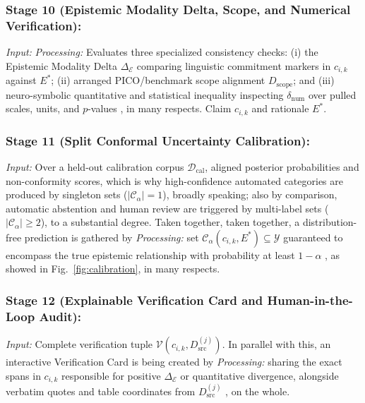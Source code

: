 \documentclass[sigconf]{acmart}
\begin{document}
\subsubsection{Stage 10 (Epistemic Modality Delta, Scope, and Numerical Verification):}
\emph{Input:} \emph{Processing:} Evaluates three specialized consistency checks: (i) the Epistemic Modality Delta $\Delta_{\mathcal{E}}$ comparing linguistic commitment markers \cite{hyland1998hedging} in $c_{i,k}$ against $E^*$; (ii) arranged PICO/benchmark scope alignment $D_{\text{scope}}$; and (iii) neuro-symbolic quantitative and statistical inequality inspecting $\delta_{\text{num}}$ over pulled scales, units, and $p$-values \cite{lu2023scitab,akhtar2023reading}, in many respects. Claim $c_{i,k}$ and rationale $E^*$.

\subsubsection{Stage 11 (Split Conformal Uncertainty Calibration):}
\emph{Input:} Over a held-out calibration corpus $\mathcal{D}_{\text{cal}}$, aligned posterior probabilities and non-conformity scores, which is why high-confidence automated categories are produced by singleton sets ($|\mathcal{C}_{\alpha}| = 1$), broadly speaking; also by comparison, automatic abstention and human review are triggered by multi-label sets ($|\mathcal{C}_{\alpha}| \geq 2$), to a substantial degree. Taken together, taken together, a distribution-free prediction is gathered by \emph{Processing:} set $\mathcal{C}_{\alpha}(c_{i,k}, E^*) \subseteq \mathcal{Y}$ guaranteed to encompass the true epistemic relationship with probability at least $1-\alpha$ \cite{sadinle2019least,angelopoulos2023conformal}, as showed in Fig.~\ref{fig:calibration}, in many respects.

\subsubsection{Stage 12 (Explainable Verification Card and Human-in-the-Loop Audit):}
\emph{Input:} Complete verification tuple $\mathcal{V}(c_{i,k}, D_{\text{src}}^{(j)})$. In parallel with this, an interactive Verification Card is being created by \emph{Processing:} sharing the exact spans in $c_{i,k}$ responsible for positive $\Delta_{\mathcal{E}}$ or quantitative divergence, alongside verbatim quotes and table coordinates from $D_{\text{src}}^{(j)}$ \cite{rashkin2023measuring,gao2023enabling}, on the whole.
\end{document}
